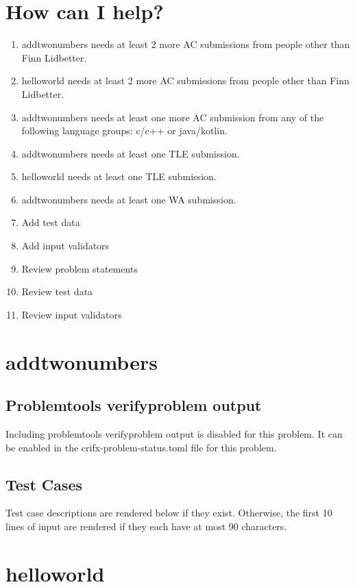 \documentclass{article}%
\begin{document}
\section{How can I help?}%
\label{sec:HowcanIhelp?}%
\begin{enumerate}%
\item%
addtwonumbers needs at least 2 more AC submissions from people other than Finn Lidbetter.%
\item%
helloworld needs at least 2 more AC submissions from people other than Finn Lidbetter.%
\item%
addtwonumbers needs at least one more AC submission from any of the following language groups: c/c++ or java/kotlin.%
\item%
addtwonumbers needs at least one TLE submission.%
\item%
helloworld needs at least one TLE submission.%
\item%
addtwonumbers needs at least one WA submission.%
\item%
Add test data%
\item%
Add input validators%
\item%
Review problem statements%
\item%
Review test data%
\item%
Review input validators%
\end{enumerate}

%
\newpage%
\section{addtwonumbers}%
\label{sec:addtwonumbers}%
\subsection{Problemtools verifyproblem output}%
\label{subsec:Problemtoolsverifyproblemoutput}%
Including problemtools verifyproblem output is disabled for this problem. It can be enabled in the crifx{-}problem{-}status.toml file for this problem.

%
\subsection{Test Cases}%
\label{subsec:TestCases}%
Test case descriptions are rendered below if they exist. Otherwise, the first 10 lines of input are rendered if they each have at most 90 characters.%

%
\newpage%
\section{helloworld}%
\label{sec:helloworld}%
\end{document}
